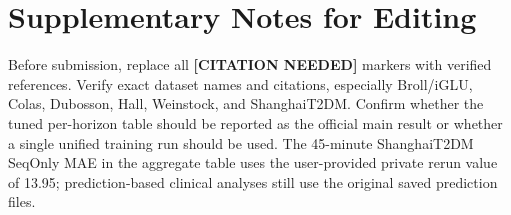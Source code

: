 \documentclass[11pt]{article}
\begin{document}
% 
% 

\appendix

\section{Supplementary Notes for Editing}

Before submission, replace all \textbf{[CITATION NEEDED]} markers with verified references. Verify exact dataset names and citations, especially Broll/iGLU, Colas, Dubosson, Hall, Weinstock, and ShanghaiT2DM. Confirm whether the tuned per-horizon table should be reported as the official main result or whether a single unified training run should be used. The 45-minute ShanghaiT2DM SeqOnly MAE in the aggregate table uses the user-provided private rerun value of 13.95; prediction-based clinical analyses still use the original saved prediction files.
\end{document}

